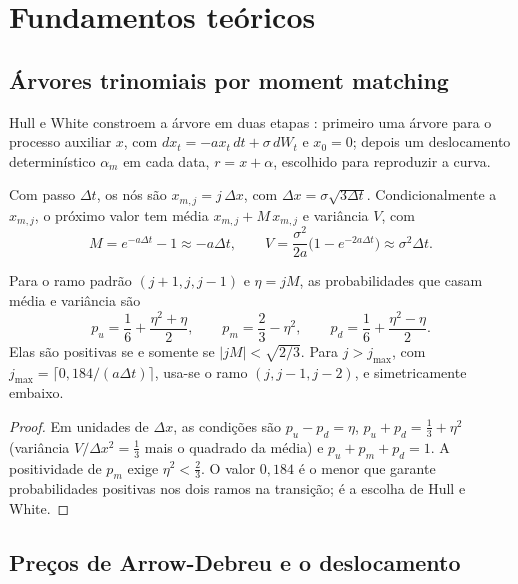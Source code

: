 \section{Fundamentos teóricos}

\subsection{Árvores trinomiais por moment matching}

Hull e White constroem a árvore em duas etapas \citep{hullwhite1994}: primeiro uma árvore para o processo auxiliar $x$, com $dx_t=-ax_t\,dt+\sigma\,dW_t$ e $x_0=0$; depois um deslocamento determinístico $\alpha_m$ em cada data, $r=x+\alpha$, escolhido para reproduzir a curva.

\begin{definicao}[Malha]
Com passo $\Delta t$, os nós são $x_{m,j}=j\,\Delta x$, com $\Delta x=\sigma\sqrt{3\Delta t}$. Condicionalmente a $x_{m,j}$, o próximo valor tem média $x_{m,j}+M\,x_{m,j}$ e variância $V$, com
\begin{equation}
M=e^{-a\Delta t}-1\approx-a\Delta t,\qquad V=\frac{\sigma^2}{2a}\big(1-e^{-2a\Delta t}\big)\approx\sigma^2\Delta t.
\end{equation}
\end{definicao}

\begin{proposicao}\label{prop:hw-probs}
Para o ramo padrão $(j+1,j,j-1)$ e $\eta=jM$, as probabilidades que casam média e variância são
\begin{equation}
p_u=\frac16+\frac{\eta^2+\eta}{2},\qquad p_m=\frac23-\eta^2,\qquad p_d=\frac16+\frac{\eta^2-\eta}{2}.
\end{equation}
Elas são positivas se e somente se $|jM|<\sqrt{2/3}$. Para $j>j_{\max}$, com $j_{\max}=\lceil0{,}184/(a\Delta t)\rceil$, usa-se o ramo $(j,j-1,j-2)$, e simetricamente embaixo.
\end{proposicao}

\begin{proof}
Em unidades de $\Delta x$, as condições são $p_u-p_d=\eta$, $p_u+p_d=\tfrac13+\eta^2$ (variância $V/\Delta x^2=\tfrac13$ mais o quadrado da média) e $p_u+p_m+p_d=1$. A positividade de $p_m$ exige $\eta^2<\tfrac23$. O valor $0{,}184$ é o menor que garante probabilidades positivas nos dois ramos na transição; é a escolha de Hull e White.
\end{proof}

\subsection{Preços de Arrow-Debreu e o deslocamento}

